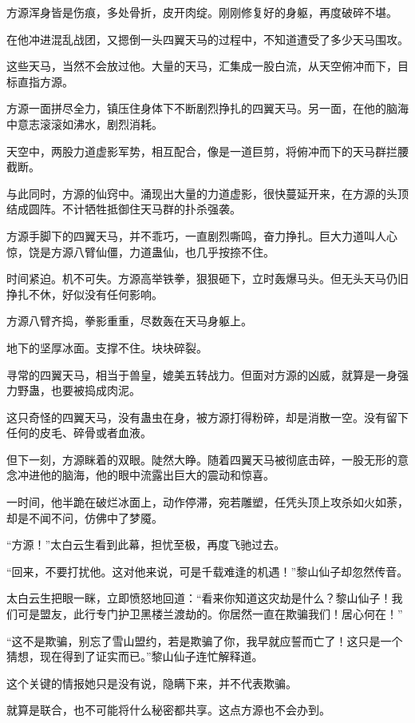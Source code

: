 \begin{this_body}
方源浑身皆是伤痕，多处骨折，皮开肉绽。刚刚修复好的身躯，再度破碎不堪。

在他冲进混乱战团，又摁倒一头四翼天马的过程中，不知道遭受了多少天马围攻。

这些天马，当然不会放过他。大量的天马，汇集成一股白流，从天空俯冲而下，目标直指方源。

方源一面拼尽全力，镇压住身体下不断剧烈挣扎的四翼天马。另一面，在他的脑海中意志滚滚如沸水，剧烈消耗。

天空中，两股力道虚影军势，相互配合，像是一道巨剪，将俯冲而下的天马群拦腰截断。

与此同时，方源的仙窍中。涌现出大量的力道虚影，很快蔓延开来，在方源的头顶结成圆阵。不计牺牲抵御住天马群的扑杀强袭。

方源手脚下的四翼天马，并不乖巧，一直剧烈嘶鸣，奋力挣扎。巨大力道叫人心惊，饶是方源八臂仙僵，力道蛊仙，也几乎按捺不住。

时间紧迫。机不可失。方源高举铁拳，狠狠砸下，立时轰爆马头。但无头天马仍旧挣扎不休，好似没有任何影响。

方源八臂齐捣，拳影重重，尽数轰在天马身躯上。

地下的坚厚冰面。支撑不住。块块碎裂。

寻常的四翼天马，相当于兽皇，媲美五转战力。但面对方源的凶威，就算是一身强力野蛊，也要被捣成肉泥。

这只奇怪的四翼天马，没有蛊虫在身，被方源打得粉碎，却是消散一空。没有留下任何的皮毛、碎骨或者血液。

但下一刻，方源眯着的双眼。陡然大睁。随着四翼天马被彻底击碎，一股无形的意念冲进他的脑海，他的眼中流露出巨大的震动和惊喜。

一时间，他半跪在破烂冰面上，动作停滞，宛若雕塑，任凭头顶上攻杀如火如荼，却是不闻不问，仿佛中了梦魇。

“方源！”太白云生看到此幕，担忧至极，再度飞驰过去。

“回来，不要打扰他。这对他来说，可是千载难逢的机遇！”黎山仙子却忽然传音。

太白云生把眼一眯，立即愤怒地回道：“看来你知道这灾劫是什么？黎山仙子！我们可是盟友，此行专门护卫黑楼兰渡劫的。你居然一直在欺骗我们！居心何在！”

“这不是欺骗，别忘了雪山盟约，若是欺骗了你，我早就应誓而亡了！这只是一个猜想，现在得到了证实而已。”黎山仙子连忙解释道。

这个关键的情报她只是没有说，隐瞒下来，并不代表欺骗。

就算是联合，也不可能将什么秘密都共享。这点方源也不会办到。


\end{this_body}
